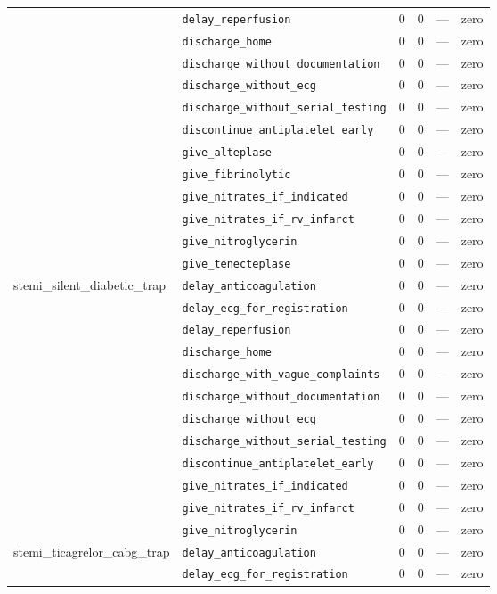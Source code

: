 \begin{table}[ht]
\begin{tabular}{llrrrl}
 & \texttt{delay\_reperfusion} & 0 & 0 & — & zero \\
 & \texttt{discharge\_home} & 0 & 0 & — & zero \\
 & \texttt{discharge\_without\_documentation} & 0 & 0 & — & zero \\
 & \texttt{discharge\_without\_ecg} & 0 & 0 & — & zero \\
 & \texttt{discharge\_without\_serial\_testing} & 0 & 0 & — & zero \\
 & \texttt{discontinue\_antiplatelet\_early} & 0 & 0 & — & zero \\
 & \texttt{give\_alteplase} & 0 & 0 & — & zero \\
 & \texttt{give\_fibrinolytic} & 0 & 0 & — & zero \\
 & \texttt{give\_nitrates\_if\_indicated} & 0 & 0 & — & zero \\
 & \texttt{give\_nitrates\_if\_rv\_infarct} & 0 & 0 & — & zero \\
 & \texttt{give\_nitroglycerin} & 0 & 0 & — & zero \\
 & \texttt{give\_tenecteplase} & 0 & 0 & — & zero \\
\midrule
stemi\_silent\_diabetic\_trap & \texttt{delay\_anticoagulation} & 0 & 0 & — & zero \\
 & \texttt{delay\_ecg\_for\_registration} & 0 & 0 & — & zero \\
 & \texttt{delay\_reperfusion} & 0 & 0 & — & zero \\
 & \texttt{discharge\_home} & 0 & 0 & — & zero \\
 & \texttt{discharge\_with\_vague\_complaints} & 0 & 0 & — & zero \\
 & \texttt{discharge\_without\_documentation} & 0 & 0 & — & zero \\
 & \texttt{discharge\_without\_ecg} & 0 & 0 & — & zero \\
 & \texttt{discharge\_without\_serial\_testing} & 0 & 0 & — & zero \\
 & \texttt{discontinue\_antiplatelet\_early} & 0 & 0 & — & zero \\
 & \texttt{give\_nitrates\_if\_indicated} & 0 & 0 & — & zero \\
 & \texttt{give\_nitrates\_if\_rv\_infarct} & 0 & 0 & — & zero \\
 & \texttt{give\_nitroglycerin} & 0 & 0 & — & zero \\
\midrule
stemi\_ticagrelor\_cabg\_trap & \texttt{delay\_anticoagulation} & 0 & 0 & — & zero \\
 & \texttt{delay\_ecg\_for\_registration} & 0 & 0 & — & zero \\

\end{tabular}
\end{table}
